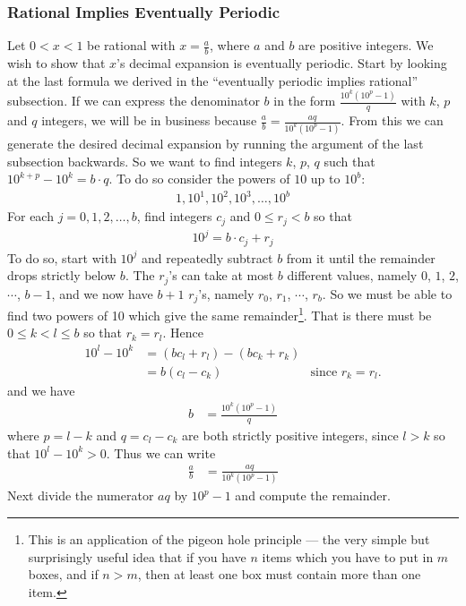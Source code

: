 \subsubsection*{Rational Implies Eventually Periodic}
Let $0<x<1$ be rational with $x=\frac{a}{b}$, where $a$ and $b$ are positive integers.  We wish to show that $x$'s decimal expansion is
eventually periodic. Start by looking at the last formula we derived in the
``eventually periodic implies rational'' subsection.
If we can express the denominator $b$ in the form $\frac{10^k(10^p-1)}{q}$
with $k$, $p$ and $q$ integers, we will be in business because
$
\frac{a}{b}=\frac{aq}{10^k(10^p-1)}.
$
From this we can generate the desired decimal expansion by running the
argument of the last subsection backwards. So we want to find integers
$k$, $p$, $q$ such that $10^{k+p} -10^k = b\cdot q$. To do so consider
the powers of $10$ up to $10^b$:
\begin{align*}
  1, 10^1, 10^2, 10^3, \dots , 10^b
\end{align*}
For each $j=0,1,2,\dots,b$, find integers $c_j$ and $0\leq r_j < b$
so that
\begin{align*}
  10^j = b \cdot c_j + r_j
\end{align*}
To do so, start with $10^j$ and repeatedly subtract $b$ from it
until the remainder drops strictly below $b$.
The $r_j$'s can take at most $b$ different values, namely $0$, $1$,
$2$, $\cdots$, $b-1$, and we now have $b+1$ $r_j$'s, namely $r_0$, $r_1$, $\cdots$, $r_b$. So we must be able to find two powers
of 10 which give the same remainder\footnote{This is an application of
the pigeon hole principle --- the very simple but surprisingly useful
idea that if you have $n$ items which you have to put in $m$ boxes,
and if $n>m$, then at least one box must contain more than one item.}.
That is there must be $0 \leq k < l \leq b$ so that $r_k =  r_l$. Hence
\begin{align*}
  10^l - 10^k &= (bc_l +r_l) - (bc_k + r_k) \\
    &= b (c_l-c_k) & \text{since $r_k=r_l$.}
\end{align*}
and we have
\begin{align*}
  b &= \frac{10^k(10^p-1)}{q}
\end{align*}
where $p=l-k$ and $q=c_l-c_k$ are both strictly positive integers, since $l>k$
so that $10^l-10^k>0$. Thus we can write
\begin{align*}
  \frac{a}{b} &= \frac{aq}{10^k (10^p-1)}
\end{align*}
Next divide the numerator $aq$ by $10^p-1$ and compute the remainder.
